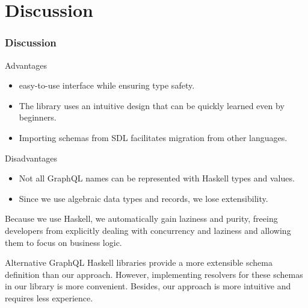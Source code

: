 \section{Discussion}

    
\begin{frame}[allowframebreaks]\frametitle{Discussion}

\begin{block}{Advantages}
\begin{itemize}
    \item easy-to-use interface while ensuring type safety.
    \item The library uses an intuitive design that can be quickly learned even by beginners.
    \item Importing schemas from SDL facilitates migration from other languages.
\end{itemize}
\end{block}

\begin{block}{Disadvantages}
\begin{itemize}
    \item Not all GraphQL names can be represented with Haskell types and values.
    \item Since we use algebraic data types and records, we lose extensibility.
\end{itemize}
\end{block}

\vspace{40pt}

Because we use Haskell, we automatically gain laziness and purity, freeing developers from explicitly dealing with concurrency and laziness and allowing them to focus on business logic. 

Alternative GraphQL Haskell libraries provide a more extensible schema definition than our approach. However, implementing resolvers for these schemas in our library is more convenient. Besides, our approach is more intuitive and requires less experience.
    
\end{frame}

